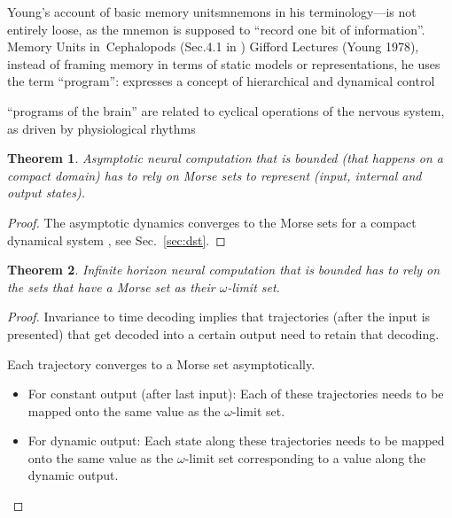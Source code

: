 \documentclass{scrartcl}
\newtheorem{theorem}{Theorem}
\theoremstyle{definition}
\theoremstyle{remark}
\begin{document}
Young’s account of basic memory unitsmnemons in his terminology—is not entirely loose, as the mnemon is supposed to ``record one bit of information''\citep{young1978}. %
Memory Units in Cephalopods (Sec.4.1 in \citep{milkowski2018})
Gifford Lectures (Young 1978), instead of framing memory in terms of static models or representations, he uses the term ``program'': expresses a concept of hierarchical and dynamical control

``programs of the brain'' are related to cyclical operations of the nervous system, as driven by physiological rhythms


\begin{theorem}
Asymptotic neural computation that is bounded (that happens on a compact domain) has to rely on Morse sets to represent (input, internal and output states).
\end{theorem}

\begin{proof}
The asymptotic dynamics converges to the Morse sets for a compact dynamical system \cite{conley1978}, see Sec.~\ref{sec:dst}.
\end{proof}


\begin{theorem}	
Infinite horizon neural computation that is bounded has to rely on the sets that have a Morse set as their $\omega$-limit set.
\end{theorem}	

\begin{proof}
Invariance to time decoding implies that trajectories (after the input is presented) that get decoded into a certain output need to retain that decoding.

Each trajectory converges to a Morse set asymptotically.

\begin{itemize}
\item For constant output (after last input): Each of these trajectories needs to be mapped onto the same value as the $\omega$-limit set.
\item For dynamic output: Each state along these trajectories needs to be mapped onto the same value as the $\omega$-limit set corresponding to a value along the dynamic output. %
\end{itemize}
\end{proof}
\end{document}

